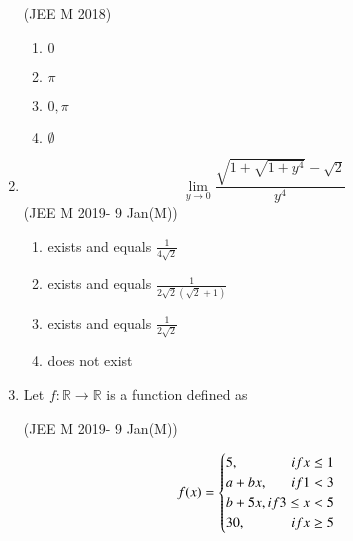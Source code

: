 \documentclass[journal,12pt,twocolumn]{IEEEtran}
\theoremstyle{remark}
\begin{document}
\begin{enumerate}
	\hfill{(JEE M 2018)}
	\begin{enumerate}[label=(\alph*)]
		\item {$0$}
		\item ${\pi}$
		\item ${0,\pi}$
		\item ${\emptyset}$ 
	\end{enumerate}
	\item  
	\[\lim_{y\to0} \frac{\sqrt{1+\sqrt{1+y^4}}-\sqrt{2}}{y^4} \]
	\hfill{(JEE M 2019- 9 Jan(M))}
	\begin{enumerate}[label=(\alph*)]
		\item exists and equals $\frac{1}{4\sqrt{2}}$
		\item exists and equals $\frac{1}{2\sqrt{2}(\sqrt{2}+1)}$
		\item exists and equals $\frac{1}{2\sqrt{2}}$
		\item does not exist
	\end{enumerate}
\item Let $f : \mathbb{R}\to\mathbb{R}$ is a function defined as

	\hfill{(JEE M 2019- 9 Jan(M))}

	\begin{equation}
	    f(x)= 
	    \begin{cases}
	    5, \hfill{if x \le 1}\\
	    a + bx, \hfill{if 1 < 3}\\
	    b + 5x, \hfill{if 3 \le x < 5}\\
	    30, \hfill{if x \ge 5}
	    \end{cases}
	\end{equation}


\end{enumerate}
\end{document}
